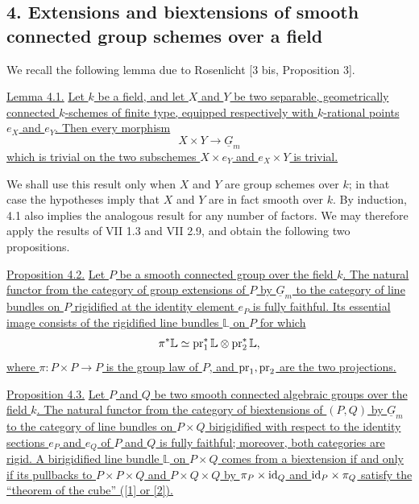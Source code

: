 
\subsection*{4. Extensions and biextensions of smooth connected group
schemes over a field}

We recall the following lemma due to Rosenlicht [3 bis, Proposition
3].

\medskip
\noindent\underline{Lemma 4.1.}  \underline{Let $k$ be a field, and
let $X$ and $Y$ be two separable, geometrically connected $k$-schemes
of finite type, equipped respectively with $k$-rational points $e_X$
and $e_Y$.  Then every morphism}
\[
 X\times Y\longrightarrow\underline G_m
\]
\underline{which is trivial on the two subschemes $X\times e_Y$ and
$e_X\times Y$ is trivial.}

We shall use this result only when $X$ and $Y$ are group schemes over
$k$; in that case the hypotheses imply that $X$ and $Y$ are in fact
smooth over $k$.  By induction, 4.1 also implies the analogous result
for any number of factors.  We may therefore apply the results of VII
1.3 and VII 2.9, and obtain the following two propositions.

\medskip
\noindent\underline{Proposition 4.2.}  \underline{Let $P$ be a
smooth connected group over the field $k$.  The natural functor from
the category of group extensions of $P$ by $\underline G_m$ to the
category of line bundles on $P$ rigidified at the identity element
$e_P$ is fully faithful.  Its essential image consists of the
rigidified line bundles $\mathbb L$ on $P$ for which}
\[
 \pi^*\mathbb L\simeq
 \operatorname{pr}_1^*\mathbb L\otimes\operatorname{pr}_2^*\mathbb L,
\]
\underline{where $\pi:P\times P\longrightarrow P$ is the group law
of $P$, and $\operatorname{pr}_1,\operatorname{pr}_2$ are the two projections.}

\medskip
\noindent\underline{Proposition 4.3.}  \underline{Let $P$ and $Q$ be
two smooth connected algebraic groups over the field $k$.  The
natural functor from the category of biextensions of $(P,Q)$ by
$\underline G_m$ to the category of line bundles on $P\times Q$
birigidified with respect to the identity sections $e_P$ and $e_Q$ of
$P$ and $Q$ is fully faithful; moreover, both categories are rigid.
A birigidified line bundle $\mathbb L$ on $P\times Q$ comes from a
biextension if and only if its pullbacks to $P\times P\times Q$ and
$P\times Q\times Q$ by $\pi_P\times\mathrm{id}_Q$ and
$\mathrm{id}_P\times\pi_Q$ satisfy the ``theorem of the cube'' ([1] or
[2]).}


